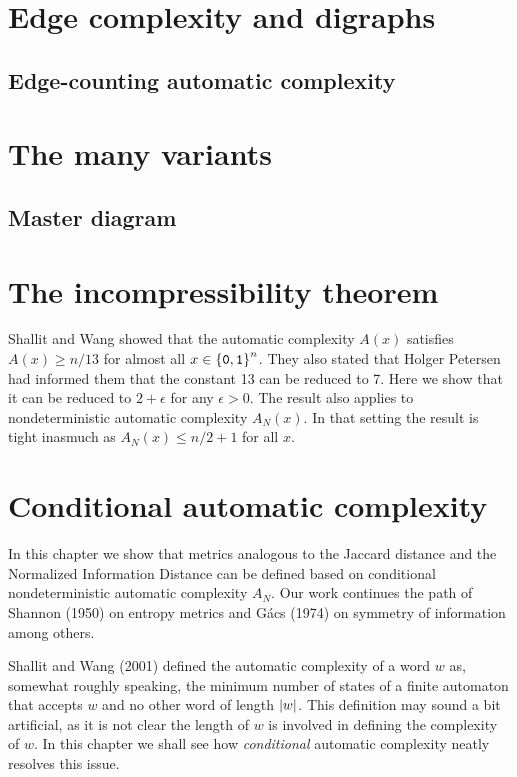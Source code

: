 \chapter{Edge complexity and digraphs}\label{chap:digraph}

	\section{Edge-counting automatic complexity}

\chapter{The many variants}\label{chap:determine}

\section{Master diagram}

\chapter{The incompressibility theorem}\label{chap:FMS}

	Shallit and Wang showed that the automatic complexity $A(x)$ satisfies $A(x)\ge n/13$ for almost all $x\in{\{\mathtt{0},\mathtt{1}\}}^n$.
	They also stated that Holger Petersen had informed them that the constant 13 can be reduced to 7.
	Here we show that it can be reduced to $2+\epsilon$ for any $\epsilon>0$.
	The result also applies to nondeterministic automatic complexity $A_N(x)$.
	In that setting the result is tight inasmuch as $A_N(x)\le n/2+1$ for all $x$.

\chapter{Conditional automatic complexity}\label{chap:metrics}

	In this chapter we show that metrics analogous to the Jaccard distance and the Normalized Information Distance can be defined based on conditional nondeterministic automatic complexity $A_N$.
	Our work continues the path of Shannon (1950) on entropy metrics and G\'acs (1974) on symmetry of information among others.

	Shallit and Wang (2001) defined the automatic complexity of a word $w$ as, somewhat roughly speaking, the minimum number of states of a finite automaton that accepts $w$ and no other word of length $\lvert w\rvert$.
	This definition may sound a bit artificial, as it is not clear the length of $w$ is involved in defining the complexity of $w$.
	In this chapter we shall see how \emph{conditional} automatic complexity neatly resolves this issue.


